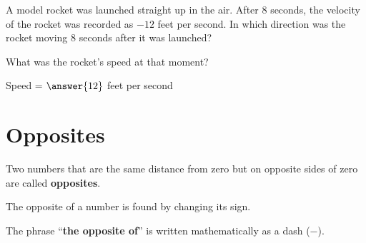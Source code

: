 \documentclass{ximera}[font=12pt]
\begin{document}
\begin{problem}
A model rocket was launched straight up in the air.  After $8$ seconds, the velocity of the rocket was recorded as $-12$ feet per second.
In which direction was the rocket moving $8$ seconds after it was launched?

\begin{multipleChoice}
\end{multipleChoice}


What was the rocket's speed at that moment?

Speed = $\answer{12}$ feet per second

\end{problem}

\section*{Opposites}

\begin{definition}

Two numbers that are the same distance from zero but on opposite sides
of zero are called \textbf{opposites}.

The opposite of a number is found by changing its sign.

The phrase ``\textbf{the opposite of}'' is written mathematically as a dash ($-$).

\end{definition}
\end{document}
